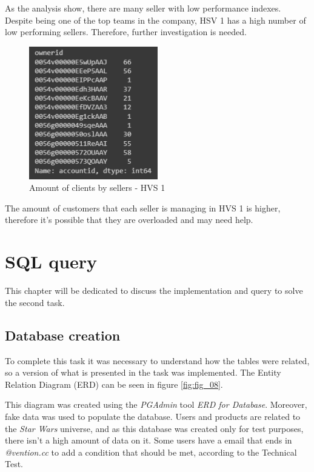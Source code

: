 \documentclass[]{report}
\begin{document}
As the analysis show, there are many seller with low performance indexes. Despite being one of the top teams in the company, HSV 1 has a high number of low performing sellers. Therefore, further investigation is needed.

\begin{figure}[htb]
	\centering
	\includegraphics[width=0.50\textwidth]{fig_06_customers_and_sellers_hs1}
	\caption{Amount of clients by sellers - HVS 1}
	\label{fig:fig_07}
\end{figure}

The amount of customers that each seller is managing in HVS 1 is higher, therefore it's possible that they are overloaded and may need help.


\chapter{SQL query}

This chapter will be dedicated to discuss the implementation and query to solve the second task.

\section{Database creation}

To complete this task it was necessary to understand how the tables were related, so a version of what is presented in the task was implemented. The Entity Relation Diagram (ERD) can be seen in figure \textcolor{blue}{\ref{fig:fig_08}}.

This diagram was created using the \textit{PGAdmin} tool \textit{ERD for Database}. Moreover, fake data was used to populate the database. Users and products are related to the \textit{Star Wars} universe, and as this database was created only for test purposes, there isn't a high amount of data on it. Some users have a email that ends in \textit{@vention.cc} to add a condition that should be met, according to the Technical Test.
\end{document}

